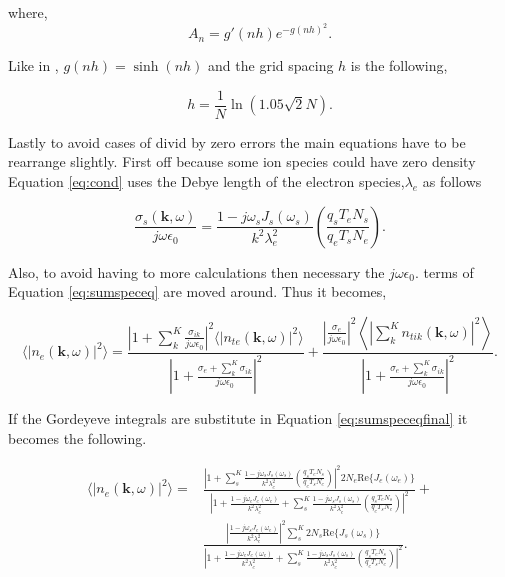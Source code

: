 \noindent where,
\begin{equation}
\label{eq:anterm}
A_n = g'(nh)e^{-g(nh)^2}.
\end{equation}

\noindent Like in \cite{Ooi:2007jx}, $g(nh) = \sinh (nh)$ and the grid spacing $h$ is the following,

\begin{equation}
\label{eq:hterm}
h = \frac{1}{N}\ln(1.05\sqrt{2}N).
\end{equation} 


Lastly to avoid cases of divid by zero errors the main equations have to be rearrange slightly. First off because some ion species could have zero density Equation \ref{eq:cond} uses the Debye length of the electron species,$\lambda_e$ as follows

\begin{equation}
\label{eq:condnew}
\frac{\sigma_{s}(\mathbf{k},\omega)}{j\omega\epsilon_0} = \frac{1-j\omega_s J_s(\omega_s)}{k^2\lambda_e^2} \left(\frac{q_sT_eN_s}{q_eT_sN_e}\right).
\end{equation}

Also, to avoid having to more calculations then necessary the $j\omega\epsilon_0$. terms of Equation \ref{eq:sumspeceq} are moved around. Thus it becomes,

\begin{equation}
\label{eq:sumspeceqfinal}
\displaystyle \langle \left|n_e(\mathbf{k},\omega)\right|^2\rangle =  \frac{\left|1 +  \sum_k^K\frac{\sigma_{ik}}{j\omega\epsilon_0} \right|^2 \langle |n_{te}(\mathbf{k},\omega)|^2\rangle}{\left|1 +\frac{\sigma_e+ \sum_k^K\sigma_{ik}}{j\omega\epsilon_0} \right|^2} + \frac{\left| \frac{\sigma_e}{j\omega\epsilon_0} \right|^2\left \langle \left|\sum_k^Kn_{tik}(\mathbf{k},\omega)\right|^2\right\rangle}{\left|1 +\frac{\sigma_e+ \sum_k^K\sigma_{ik}}{j\omega\epsilon_0} \right|^2}.
\end{equation}

\noindent If the Gordeyeve integrals are substitute in Equation \ref{eq:sumspeceqfinal} it becomes the following.

\begin{equation}
\label{eq:sumspeceqactual}
\begin{split}
\displaystyle \langle \left|n_e(\mathbf{k},\omega)\right|^2\rangle =&  \frac{\left|1 + \sum_s^K  \frac{1-j\omega_s J_s(\omega_s)}{k^2\lambda_e^2} \left(\frac{q_sT_eN_s}{q_eT_sN_e}\right) \right|^2 2N_e\text{Re}\{J_e(\omega_e)\}}{\left|1 + \frac{1-j\omega_e J_e(\omega_e)}{k^2\lambda_e^2}  +\sum_s^K  \frac{1-j\omega_s J_s(\omega_s)}{k^2\lambda_e^2} \left(\frac{q_sT_eN_s}{q_eT_sN_e}\right) \right|^2}       + \\        & \frac{\left| \frac{1-j\omega_s J_e(\omega_e)}{k^2\lambda_e^2} \right|^2\sum_s^K  2N_s\text{Re}\{J_s(\omega_s)\}}{\left|1 + \frac{1-j\omega_e J_e(\omega_e)}{k^2\lambda_e^2}  +\sum_s^K  \frac{1-j\omega_s J_s(\omega_s)}{k^2\lambda_e^2} \left(\frac{q_sT_eN_s}{q_eT_sN_e}\right) \right|^2}.
\end{split}
\end{equation}

